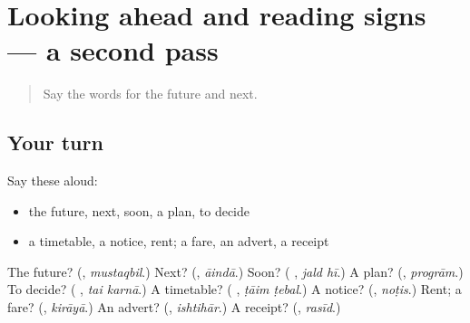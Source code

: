\section[(dialogue)]{Looking ahead and reading signs — a second pass}

\label{lesson:UR-R146-second-pass-looking-ahead-and-reading-signs}



\begin{quote}
Say the words for the future and next.
\end{quote}

\subsection*{Your turn}
Say these aloud:

\begin{itemize}
\raggedright
  \item the future, next, soon, a plan, to decide
  \item a timetable, a notice, rent; a fare, an advert, a receipt
\end{itemize}

\begin{tcolorbox}[breakable,colback=teal!4,colframe=teal!35!black,title={Before you move on}]
The future? (\textbf{}, \emph{mustaqbil}.) Next? (\textbf{}, \emph{āindā}.) Soon? (\textbf{ }, \emph{jald hī}.) A plan? (\textbf{}, \emph{progrām}.) To decide? (\textbf{ }, \emph{tai karnā}.) A timetable? (\textbf{ }, \emph{ṭāim ṭebal}.) A notice? (\textbf{}, \emph{noṭis}.) Rent; a fare? (\textbf{}, \emph{kirāyā}.) An advert? (\textbf{}, \emph{ishtihār}.) A receipt? (\textbf{}, \emph{rasīd}.)
\end{tcolorbox}
